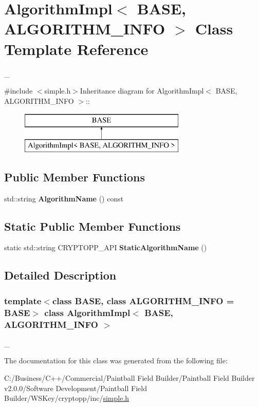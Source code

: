 \hypertarget{class_algorithm_impl}{
\section{AlgorithmImpl$<$ BASE, ALGORITHM\_\-INFO $>$ Class Template Reference}
\label{class_algorithm_impl}
}


\_\-  


{\ttfamily \#include $<$simple.h$>$}Inheritance diagram for AlgorithmImpl$<$ BASE, ALGORITHM\_\-INFO $>$::\begin{figure}[H]
\begin{center}
\leavevmode
\includegraphics[height=2cm]{class_algorithm_impl}
\end{center}
\end{figure}
\subsection*{Public Member Functions}
\begin{DoxyCompactItemize}
\item 
\hypertarget{class_algorithm_impl_a9d6e3714fc32c36789147d9f3b627eeb}{
std::string {\bfseries AlgorithmName} () const }
\label{class_algorithm_impl_a9d6e3714fc32c36789147d9f3b627eeb}

\end{DoxyCompactItemize}
\subsection*{Static Public Member Functions}
\begin{DoxyCompactItemize}
\item 
\hypertarget{class_algorithm_impl_a99b30280ecd592d713876dbd9e3817be}{
static std::string CRYPTOPP\_\-API {\bfseries StaticAlgorithmName} ()}
\label{class_algorithm_impl_a99b30280ecd592d713876dbd9e3817be}

\end{DoxyCompactItemize}


\subsection{Detailed Description}
\subsubsection*{template$<$class BASE, class ALGORITHM\_\-INFO = BASE$>$ class AlgorithmImpl$<$ BASE, ALGORITHM\_\-INFO $>$}

\_\- 

The documentation for this class was generated from the following file:\begin{DoxyCompactItemize}
\item 
C:/Business/C++/Commercial/Paintball Field Builder/Paintball Field Builder v2.0.0/Software Development/Paintball Field Builder/WSKey/cryptopp/inc/\hyperlink{simple_8h}{simple.h}\end{DoxyCompactItemize}
